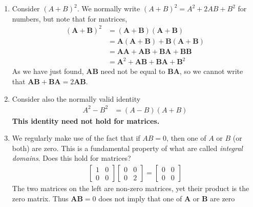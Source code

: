 \documentclass[11pt]{article}
\newcommand{\mat}[1]{\mathbf{#1}}
\begin{document}
\begin{enumerate}
\item{
Consider $(A+B)^2$. We normally write $(A+B)^2 = A^2 + 2AB + B^2$ for numbers, but note that for matrices,
\begin{align*}
(\mat{A} + \mat{B})^2 &= (\mat{A} + \mat{B})(\mat{A} + \mat{B})
\\
&= \mat{A} ( \mat{A} + \mat{B} ) + \mat{B} ( \mat{A} + \mat{B} )
\\
&= \mat{A}\mat{A} + \mat{A}\mat{B} + \mat{B}\mat{A} + \mat{B}\mat{B}
\\
&= \mat{A}^2 + \mat{A} \mat{B} + \mat{B} \mat{A} + \mat{B}^2
\end{align*}
As we have just found, $\mat{A}\mat{B}$ need not be equal to $\mat{B}\mat{A}$, so we cannot write that $\mat{A}\mat{B} + \mat{B}\mat{A} = 2 \mat{A} \mat{B}$.

}
\item{

Consider also the normally valid identity
\begin{align*}
A^2 - B^2 &= (A-B)(A+B)
\end{align*}
\textbf{This identity need not hold for matrices.}
}
\item{
We regularly make use of the fact that if $AB = 0$, then one of $A$ or $B$ (or both) are zero. This is a fundamental property of what are called \emph{integral domains}. Does this hold for matrices?
\begin{align*}
\begin{bmatrix}
1 & 0 \\ 0 & 0
\end{bmatrix}
\begin{bmatrix}
0 & 0 \\ 0 & 2
\end{bmatrix}
=
\begin{bmatrix}
0 & 0 \\ 0 & 0
\end{bmatrix}
\end{align*}
The two matrices on the left are non-zero matrices, yet their product is the zero matrix. Thus $\mat{A} \mat{B} = 0$ does not imply that one of $\mat{A}$ or $\mat{B}$ are zero
}
\end{enumerate}
\end{document}
